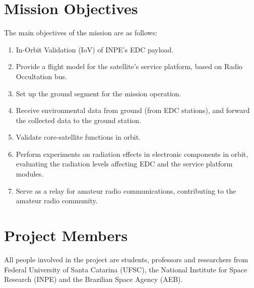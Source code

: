 

\section{Mission Objectives}

The main objectives of the mission are as follows:

\begin{enumerate}
    \item In-Orbit Validation (IoV) of INPE's EDC payload.
    \item Provide a flight model for the satellite's service platform, based on Radio Occultation bus.
    \item Set up the ground segment for the mission operation.
    \item Receive environmental data from ground (from EDC stations), and forward the collected data to the ground station.
    \item Validate core-satellite functions in orbit.
    \item Perform experiments on radiation effects in electronic components in orbit, evaluating the radiation levels affecting EDC and the service platform modules.
    \item Serve as a relay for amateur radio communications, contributing to the amateur radio community.
\end{enumerate}

\section{Project Members}

All people involved in the project are students, professors and researchers from Federal University of Santa Catarina (UFSC), the National Institute for Space Research (INPE) and the Brazilian Space Agency (AEB).

